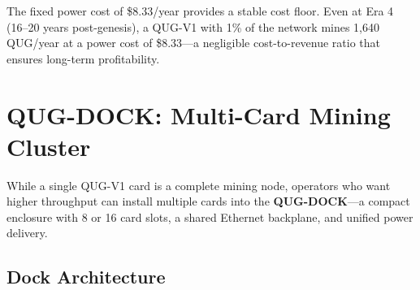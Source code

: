 \documentclass[11pt,a4paper]{article}
\begin{document}
The fixed power cost of \$8.33/year provides a stable cost floor. Even at Era 4 (16--20 years post-genesis), a QUG-V1 with 1\% of the network mines 1,640 QUG/year at a power cost of \$8.33---a negligible cost-to-revenue ratio that ensures long-term profitability.

\section{QUG-DOCK: Multi-Card Mining Cluster}
\label{sec:dock}

While a single QUG-V1 card is a complete mining node, operators who want higher throughput can install multiple cards into the \textbf{QUG-DOCK}---a compact enclosure with 8 or 16 card slots, a shared Ethernet backplane, and unified power delivery.

\subsection{Dock Architecture}
\end{document}
